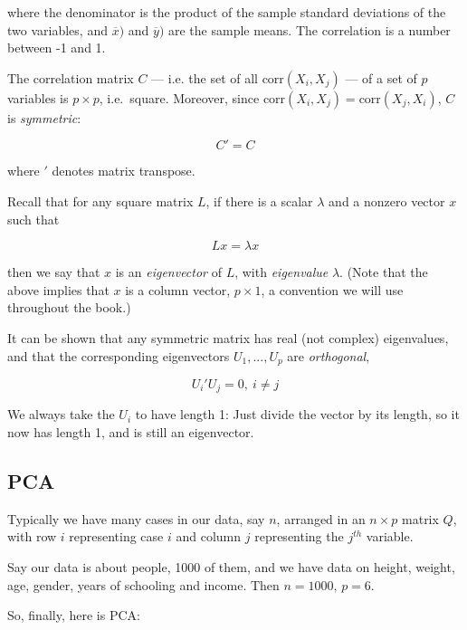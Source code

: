 where the denominator is the product of the sample standard deviations of the
two variables, and $\overline{x})$ and $\overline{y})$ are the sample
means.  The correlation is a number between -1 and 1.

The correlation matrix $C$ --- i.e. the set of all
$\textrm{corr}(X_i,X_j)$ --- of a set of $p$ variables is $p \times p$,
i.e.\ square.  Moreover, since $\textrm{corr}(X_i,X_j) =
\textrm{corr}(X_j,X_i)$, $C$ is \textit{symmetric}:

\begin{equation}
C' = C
\end{equation}

where $'$ denotes matrix transpose.  

Recall that for any square matrix $L$, if there is a scalar $\lambda$
and a nonzero vector $x$ such that 

\begin{equation}
Lx = \lambda x
\end{equation}

then we say that $x$ is an \textit{eigenvector} of $L$, with
\textit{eigenvalue} $\lambda$.  (Note that the above implies that $x$ is
a column vector, $p \times 1$, a convention we will use throughout the
book.)

It can be shown that any symmetric matrix has real (not complex)
eigenvalues, and that the corresponding eigenvectors $U_1,...,U_p$
are \textit{orthogonal},

\begin{equation}
U_i' U_j = 0, ~ i \neq j
\end{equation}

We always take the $U_i$ to have length 1:  Just divide the vector by
its length, so it now has length 1, and is still an eigenvector.

\subsection{PCA}

Typically we have many cases in our data, say $n$, arranged in an $n
\times p$ matrix $Q$, with row $i$ representing case $i$ and column $j$
representing the $j^{th}$ variable.

Say our data is about people, 1000 of them, and we have data on height,
weight, age, gender, years of schooling and income.  Then $n = 1000$, $p
= 6$.

So, finally, here is PCA:

